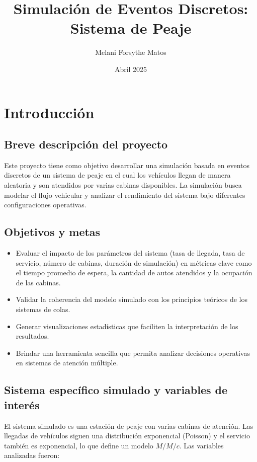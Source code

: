 \documentclass[12pt]{article}
\title{Simulación de Eventos Discretos: Sistema de Peaje}
\author{Melani Forsythe Matos}
\date{Abril 2025}
\begin{document}
\maketitle


\section{Introducción}

\subsection*{Breve descripción del proyecto}
Este proyecto tiene como objetivo desarrollar una simulación basada en eventos discretos de un sistema de peaje en el cual los vehículos llegan de manera aleatoria y son atendidos por varias cabinas disponibles. La simulación busca modelar el flujo vehicular y analizar el rendimiento del sistema bajo diferentes configuraciones operativas.

\subsection*{Objetivos y metas}
\begin{itemize}
    \item Evaluar el impacto de los parámetros del sistema (tasa de llegada, tasa de servicio, número de cabinas, duración de simulación) en métricas clave como el tiempo promedio de espera, la cantidad de autos atendidos y la ocupación de las cabinas.
    \item Validar la coherencia del modelo simulado con los principios teóricos de los sistemas de colas.
    \item Generar visualizaciones estadísticas que faciliten la interpretación de los resultados.
    \item Brindar una herramienta sencilla que permita analizar decisiones operativas en sistemas de atención múltiple.
\end{itemize}

\subsection*{Sistema específico simulado y variables de interés}
El sistema simulado es una estación de peaje con varias cabinas de atención. Las llegadas de vehículos siguen una distribución exponencial (Poisson) y el servicio también es exponencial, lo que define un modelo $M/M/c$. Las variables analizadas fueron:
\end{document}
